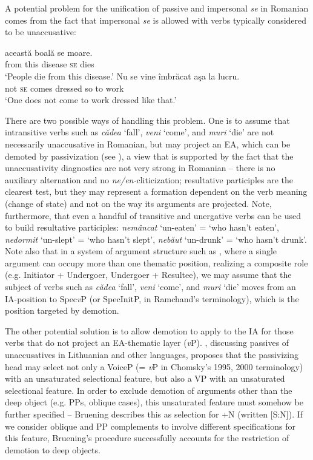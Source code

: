 \documentclass[output=paper]{langsci/langscibook}
\begin{document}
A potential problem for the unification of passive and impersonal \textit{se} in Romanian comes from the fact that impersonal \textit{se} is allowed with verbs typically considered to be unaccusative:

\ea%
    \label{ex:giurgea:11}
    \ea
     această boală    se  moare.\\
         from  this       disease \textsc{se} dies\\
    \glt ‘People die from this disease.’
    \ex
    \gll Nu se vine     îmbrăcat aşa la lucru.\\
         not \textsc{se} comes dressed  so   to work\\
    \glt ‘One does not come to work dressed like that.’
    \z
\z    
 
There are two possible ways of handling this problem. One is to assume that intransitive verbs such as \textit{cădea} ‘fall’, \textit{veni} ‘come’, and \textit{muri} ‘die’ are not necessarily unaccusative in Romanian, but may project an EA, which can be demoted by passivization (see \citealt{Dobrovie-Sorin1987,Dobrovie-Sorin1994}), a view that is supported by the fact that the unaccusativity diagnostics are not very strong in Romanian – there is no auxiliary alternation and no \textit{ne\slash en-}cliticization; resultative participles are the clearest test, but they may represent a formation dependent on the verb meaning (change of state) and not on the way its arguments are projected. Note, furthermore, that even a handful of transitive and unergative verbs can be used to build resultative participles: \textit{nemâncat} ‘un-eaten’ = ‘who hasn’t eaten’, \textit{nedormit} ‘un-slept’ = ‘who hasn’t slept’, \textit{nebăut} ‘un-drunk’ = ‘who hasn’t drunk’. Note also that in a system of argument structure such as , where a single argument can occupy more than one thematic position, realizing a composite role (e.g. Initiator + Undergoer, Undergoer + Resultee), we may assume that the subject of verbs such as \textit{cădea} ‘fall’, \textit{veni} ‘come’, and \textit{muri} ‘die’ moves from an IA-position to Spec\textit{v}P (or SpecInitP, in Ramchand’s terminology), which is the position targeted by demotion.   

  The other potential solution is to allow demotion to apply to the IA for those verbs that do not project an EA-thematic layer (\textit{v}P). \citet{Bruening2012}, discussing passives of unaccusatives in Lithuanian and other languages, proposes that the passivizing head may select not only a VoiceP (= \textit{v}P in Chomsky’s 1995, 2000 terminology) with an unsaturated selectional feature, but also a VP with an unsaturated selectional feature. In order to exclude demotion of arguments other than the deep object (e.g. PPs, oblique cases), this unsaturated feature must somehow be further specified – Bruening describes this as selection for +N (written [S:N]). If we consider oblique and PP complements to involve different specifications for this feature, Bruening’s procedure successfully accounts for the restriction of demotion to deep objects. 
\end{document}
